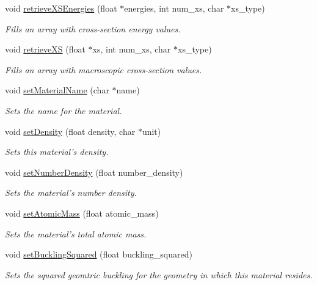 \begin{DoxyCompactItemize}
void \hyperlink{classMaterial_a01e69f371011e7c80b1f8ba9c3b57204}{retrieve\-X\-S\-Energies} (float $\ast$energies, int num\-\_\-xs, char $\ast$xs\-\_\-type)
\begin{DoxyCompactList}\small\item\em Fills an array with cross-\/section energy values. \end{DoxyCompactList}\item 
void \hyperlink{classMaterial_ab5b5e2078eddb057841b77ccd4110071}{retrieve\-X\-S} (float $\ast$xs, int num\-\_\-xs, char $\ast$xs\-\_\-type)
\begin{DoxyCompactList}\small\item\em Fills an array with macroscopic cross-\/section values. \end{DoxyCompactList}\item 
void \hyperlink{classMaterial_a89e56bc82fcefcd2c73ab4a525a00129}{set\-Material\-Name} (char $\ast$name)
\begin{DoxyCompactList}\small\item\em Sets the name for the material. \end{DoxyCompactList}\item 
void \hyperlink{classMaterial_a24c5b8d61359fd8a9843c3e71f286e01}{set\-Density} (float density, char $\ast$unit)
\begin{DoxyCompactList}\small\item\em Sets this material's density. \end{DoxyCompactList}\item 
void \hyperlink{classMaterial_a49b4d4fb7a51ef75cebffdd52d8c6931}{set\-Number\-Density} (float number\-\_\-density)
\begin{DoxyCompactList}\small\item\em Sets the material's number density. \end{DoxyCompactList}\item 
void \hyperlink{classMaterial_a25785b407a07d9509458cdd342aef877}{set\-Atomic\-Mass} (float atomic\-\_\-mass)
\begin{DoxyCompactList}\small\item\em Sets the material's total atomic mass. \end{DoxyCompactList}\item 
void \hyperlink{classMaterial_aeebedf71fc23735ed99c5ab3f5728b25}{set\-Buckling\-Squared} (float buckling\-\_\-squared)
\begin{DoxyCompactList}\small\item\em Sets the squared geomtric buckling for the geometry in which this material resides. \end{DoxyCompactList}\item 

\end{DoxyCompactItemize}
